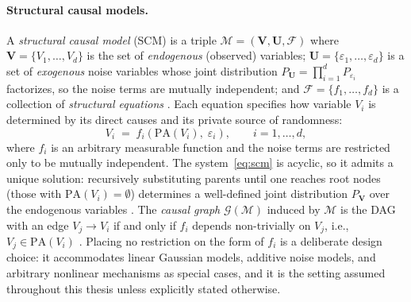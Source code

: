 \paragraph{Structural causal models.}
A \emph{structural causal model} (SCM) is a triple $\mathcal{M} = (\mathbf{V}, \mathbf{U}, \mathcal{F})$ where $\mathbf{V} = \{V_1, \ldots, V_d\}$ is the set of \emph{endogenous} (observed) variables; $\mathbf{U} = \{\varepsilon_1, \ldots, \varepsilon_d\}$ is a set of \emph{exogenous} noise variables whose joint distribution $P_{\mathbf{U}} = \prod_{i=1}^d P_{\varepsilon_i}$ factorizes, so the
noise terms are mutually independent; and $\mathcal{F} = \{f_1, \ldots, f_d\}$ is a collection of \emph{structural equations} \cite{Pearl_2009, Peters2017ElementsOC}.
Each equation specifies how variable $V_i$ is determined by its direct causes and its private source of randomness:
\begin{equation}
    V_i \;=\; f_i\!\left(\mathrm{PA}(V_i),\; \varepsilon_i\right),
    \qquad i = 1, \ldots, d,
    \label{eq:scm}
\end{equation}
where $f_i$ is an arbitrary measurable function and the noise terms are restricted only to be mutually independent.
The system~\eqref{eq:scm} is acyclic, so it admits a unique solution:
recursively substituting parents until one reaches root nodes (those with $\mathrm{PA}(V_i) = \emptyset$) determines a well-defined joint distribution $P_{\mathbf{V}}$ over the endogenous variables \cite{Peters2017ElementsOC}.
The \emph{causal graph} $\mathcal{G}(\mathcal{M})$ induced by $\mathcal{M}$ is the DAG with an edge $V_j \to V_i$ if and only if $f_i$ depends non-trivially on $V_j$, i.e., $V_j \in \mathrm{PA}(V_i)$ \cite{Pearl_2009}.
Placing no restriction on the form of $f_i$ is a deliberate design choice: it accommodates linear Gaussian models, additive noise models, and arbitrary nonlinear mechanisms as special cases, and it is the setting assumed throughout this thesis unless explicitly stated otherwise.

